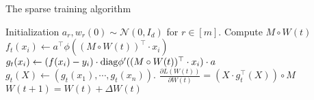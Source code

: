 \begin{algorithm}\caption{The sparse training algorithm
}
\begin{algorithmic}[1]
    \State Initialization $a_r, w_r(0)\sim \mathcal{N}(0, I_d)$ for $r\in[m]$.
        \State Compute $M\circ W(t)$ 
            \State $f_t(x_i)\leftarrow a^\top \phi((M\circ W(t))^\top \cdot x_i)$ 
            \State $g_t(x_i) \leftarrow (f(x_i)-y_i)\cdot \mathrm{diag}{\phi'((M\circ W(t))^\top \cdot x_i)}\cdot a$ 
        \EndFor
        \State $g_t(X) \leftarrow (g_t(x_1),\cdots, g_t(x_n))$.
        \State $\frac{\partial L(W(t))}{ \partial W(t)} = (X\cdot g^\top_t(X))\circ M$ 
        \State $W(t+1) = W(t) + \Delta W(t)$ 
    \EndFor
\EndProcedure
\end{algorithmic}
\end{algorithm}




